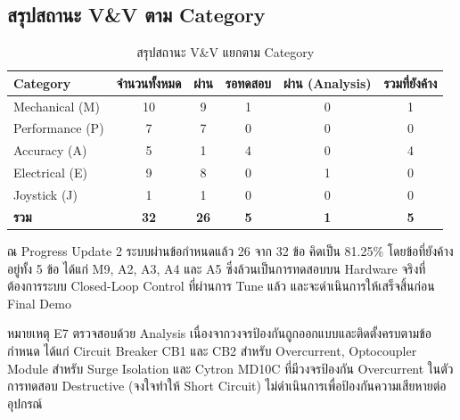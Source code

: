\subsection{สรุปสถานะ V\&V ตาม Category}
\label{subsec:vv_status_summary}

\begin{table}[H]
  \centering
  \caption{สรุปสถานะ V\&V แยกตาม Category}
  \label{tab:vv_summary}
  \begin{tabular}{lccccc}
    \toprule
    Category & จำนวนทั้งหมด & ผ่าน & รอทดสอบ & ผ่าน (Analysis) & รวมที่ยังค้าง \\
    \midrule
    Mechanical (M)         & 10 & 9 & 1 & 0 & 1 \\
    Performance (P)        & 7  & 7 & 0 & 0 & 0 \\
    Accuracy (A)           & 5  & 1 & 4 & 0 & 4 \\
    Electrical (E)         & 9  & 8 & 0 & 1 & 0 \\
    Joystick (J)           & 1  & 1 & 0 & 0 & 0 \\
    \midrule
    \textbf{รวม}           & \textbf{32} & \textbf{26} & \textbf{5} & \textbf{1} & \textbf{5} \\
    \bottomrule
  \end{tabular}
\end{table}

ณ Progress Update 2 ระบบผ่านข้อกำหนดแล้ว 26 จาก 32 ข้อ
คิดเป็น 81.25\% โดยข้อที่ยังค้างอยู่ทั้ง 5 ข้อ
ได้แก่ M9, A2, A3, A4 และ A5
ซึ่งล้วนเป็นการทดสอบบน Hardware จริงที่ต้องการระบบ
Closed-Loop Control ที่ผ่านการ Tune แล้ว
และจะดำเนินการให้เสร็จสิ้นก่อน Final Demo

หมายเหตุ E7 ตรวจสอบด้วย Analysis
เนื่องจากวงจรป้องกันถูกออกแบบและติดตั้งครบตามข้อกำหนด
ได้แก่ Circuit Breaker CB1 และ CB2 สำหรับ Overcurrent,
Optocoupler Module สำหรับ Surge Isolation
และ Cytron MD10C ที่มีวงจรป้องกัน Overcurrent ในตัว
การทดสอบ Destructive (จงใจทำให้ Short Circuit)
ไม่ดำเนินการเพื่อป้องกันความเสียหายต่ออุปกรณ์